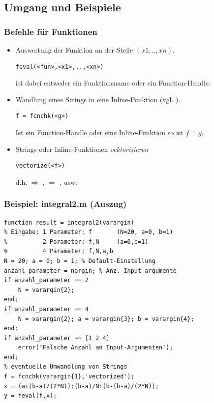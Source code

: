 \documentclass[hyperref={xetex}]{beamer}
\begin{document}
\subsection{Umgang und Beispiele}
%
%
\begin{frame}[fragile]\frametitle{Befehle f\"ur Funktionen}
\begin{itemize}
\item Auswertung der Funktion   an der Stelle $(x1,..,xn)$. 
\begin{lstlisting}
feval(<fun>,<x1>,..,<xn>)
\end{lstlisting}
 ist dabei
  entweder ein Funktionsname oder ein Function-Handle. 
\item Wandlung eines Strings  in eine Inline-Funktion (vgl. ). 
\begin{lstlisting}
f = fcnchk(<g>) 
\end{lstlisting}
Ist  ein
  Function-Handle oder eine Inline-Funktion so ist $f = g$.  

\item Strings oder Inline-Funktionen  \textsl{vektorisieren}
\begin{lstlisting}
vectorize(<f>)
\end{lstlisting}
d.h.  $\Rightarrow$  ,  $\Rightarrow$ , usw. 

\end{itemize}
\end{frame}
%
%
\begin{frame}[fragile]\frametitle{Beispiel: integral2.m (Auszug)}
\begin{lstlisting}
function result = integral2(varargin)
% Eingabe: 1 Parameter: f       (N=20, a=0, b=1)
%          2 Parameter: f,N     (a=0,b=1)
%          4 Parameter: f,N,a,b
N = 20; a = 0; b = 1; % Default-Einstellung
anzahl_parameter = nargin; % Anz. Input-argumente
if anzahl_parameter == 2 
    N = varargin{2};
end;
if anzahl_parameter == 4
    N = varargin{2}; a = varargin{3}; b = varargin{4};
end;
if anzahl_parameter ~= [1 2 4]
    error('Falsche Anzahl an Input-Argumenten');
end;
% eventuelle Umwandlung von Strings
f = fcnchk(varargin{1},'vectorized'); 
x = (a+(b-a)/(2*N)):(b-a)/N:(b-(b-a)/(2*N));
y = feval(f,x);  
\end{lstlisting}
\end{frame}
% 
% 
\end{document}
